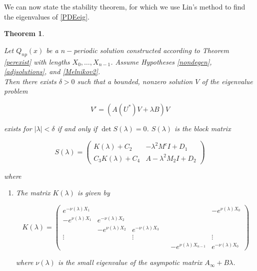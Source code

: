 \documentclass[12pt]{article}
\newtheorem{theorem}{Theorem}
\begin{document}
We can now state the stability theorem, for which we use Lin's method to find the eigenvalues of \eqref{PDEeig}.


\begin{theorem}\label{PDEeigtheorem}

Let $Q_{np}(x)$ be a $n-$periodic solution constructed according to Theorem \ref{perexist} with lengths $X_0, \dots, X_{n-1}$. Assume Hypotheses \ref{nondegen}, \ref{adjsolutions}, and \ref{Melnikov2}.\\

Then there exists $\delta > 0$ such that a bounded, nonzero solution $V$ of the eigenvalue problem 

\begin{equation}
V' = ( A(U^*)V + \lambda B)V 
\end{equation}

exists for $|\lambda| < \delta$ if and only if $\det S(\lambda) = 0$. $S(\lambda)$ is the block matrix

\begin{equation}\label{blockmatrix}
S(\lambda) = 
\begin{pmatrix}
K(\lambda) + C_2 & -\lambda^2 M^c I + D_1 \\
C_3 K(\lambda) + C_4 & A - \lambda^2 M_2 I + D_2
\end{pmatrix}
\end{equation}

where 

\begin{enumerate}

\item The matrix $K(\lambda)$ is given by

\begin{equation}
K(\lambda) = 
\begin{pmatrix}
e^{-\nu(\lambda)X_1} & & & & & -e^{\nu(\lambda)X_0} \\
-e^{\nu(\lambda)X_1} & e^{-\nu(\lambda)X_2} \\
& -e^{\nu(\lambda)X_2} & e^{-\nu(\lambda)X_3} \\
\vdots & & \vdots & &&  \vdots \\
& & & & -e^{\nu(\lambda)X_{n-1}} & e^{-\nu(\lambda)X_0} 
\end{pmatrix}
\end{equation}

where $\nu(\lambda)$ is the small eigenvalue of the asympotic matrix $A_\infty + B \lambda$.


\end{enumerate}
\end{theorem}
\end{document}
